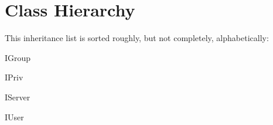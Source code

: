 \section{Class Hierarchy}
This inheritance list is sorted roughly, but not completely, alphabetically\+:\begin{DoxyCompactList}
\item I\+Group\begin{DoxyCompactList}
\item {}
\end{DoxyCompactList}
\item I\+Priv\begin{DoxyCompactList}
\item {}
\end{DoxyCompactList}
\item I\+Server\begin{DoxyCompactList}
\item {}
\end{DoxyCompactList}
\item I\+User\begin{DoxyCompactList}
\item {}
\end{DoxyCompactList}
\end{DoxyCompactList}

